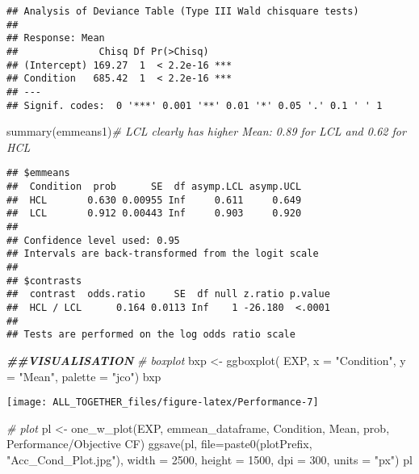 \documentclass[
]{article}
\newenvironment{Shaded}{\begin{snugshade}}{\end{snugshade}}
\newcommand{\AttributeTok}[1]{\textcolor[rgb]{0.77,0.63,0.00}{#1}}
\newcommand{\CommentTok}[1]{\textcolor[rgb]{0.56,0.35,0.01}{\textit{#1}}}
\newcommand{\DecValTok}[1]{\textcolor[rgb]{0.00,0.00,0.81}{#1}}
\newcommand{\DocumentationTok}[1]{\textcolor[rgb]{0.56,0.35,0.01}{\textbf{\textit{#1}}}}
\newcommand{\FunctionTok}[1]{\textcolor[rgb]{0.00,0.00,0.00}{#1}}
\newcommand{\NormalTok}[1]{#1}
\newcommand{\OtherTok}[1]{\textcolor[rgb]{0.56,0.35,0.01}{#1}}
\newcommand{\StringTok}[1]{\textcolor[rgb]{0.31,0.60,0.02}{#1}}
\begin{document}
\begin{verbatim}
## Analysis of Deviance Table (Type III Wald chisquare tests)
## 
## Response: Mean
##              Chisq Df Pr(>Chisq)    
## (Intercept) 169.27  1  < 2.2e-16 ***
## Condition   685.42  1  < 2.2e-16 ***
## ---
## Signif. codes:  0 '***' 0.001 '**' 0.01 '*' 0.05 '.' 0.1 ' ' 1
\end{verbatim}

\begin{Shaded}
\begin{Highlighting}[]
\FunctionTok{summary}\NormalTok{(emmeans1)}\CommentTok{\# LCL clearly has higher Mean: 0.89 for LCL and 0.62 for HCL}
\end{Highlighting}
\end{Shaded}

\begin{verbatim}
## $emmeans
##  Condition  prob      SE  df asymp.LCL asymp.UCL
##  HCL       0.630 0.00955 Inf     0.611     0.649
##  LCL       0.912 0.00443 Inf     0.903     0.920
## 
## Confidence level used: 0.95 
## Intervals are back-transformed from the logit scale 
## 
## $contrasts
##  contrast  odds.ratio     SE  df null z.ratio p.value
##  HCL / LCL      0.164 0.0113 Inf    1 -26.180  <.0001
## 
## Tests are performed on the log odds ratio scale
\end{verbatim}

\begin{Shaded}
\begin{Highlighting}[]
\DocumentationTok{\#\#VISUALISATION}
\CommentTok{\# boxplot }
\NormalTok{bxp }\OtherTok{\textless{}{-}} \FunctionTok{ggboxplot}\NormalTok{(}
\NormalTok{  EXP, }\AttributeTok{x =} \StringTok{"Condition"}\NormalTok{, }\AttributeTok{y =} \StringTok{"Mean"}\NormalTok{, }\AttributeTok{palette =} \StringTok{"jco"}\NormalTok{)}
\NormalTok{bxp}
\end{Highlighting}
\end{Shaded}

\texttt{[image: ALL\_TOGETHER\_files/figure-latex/Performance-7]}

\begin{Shaded}
\begin{Highlighting}[]
\CommentTok{\#  plot}
\NormalTok{pl }\OtherTok{\textless{}{-}} \FunctionTok{one\_w\_plot}\NormalTok{(EXP, emmean\_dataframe, }\StringTok{\textquotesingle{}Condition\textquotesingle{}}\NormalTok{, }\StringTok{\textquotesingle{}Mean\textquotesingle{}}\NormalTok{, }\StringTok{\textquotesingle{}prob\textquotesingle{}}\NormalTok{, }\StringTok{\textquotesingle{}Performance/Objective CF\textquotesingle{}}\NormalTok{)}
\FunctionTok{ggsave}\NormalTok{(pl, }\AttributeTok{file=}\FunctionTok{paste0}\NormalTok{(plotPrefix, }\StringTok{"Acc\_Cond\_Plot.jpg"}\NormalTok{), }\AttributeTok{width =} \DecValTok{2500}\NormalTok{, }\AttributeTok{height =} \DecValTok{1500}\NormalTok{, }\AttributeTok{dpi =} \DecValTok{300}\NormalTok{, }\AttributeTok{units =} \StringTok{"px"}\NormalTok{)}
\NormalTok{pl}
\end{Highlighting}
\end{Shaded}
\end{document}
